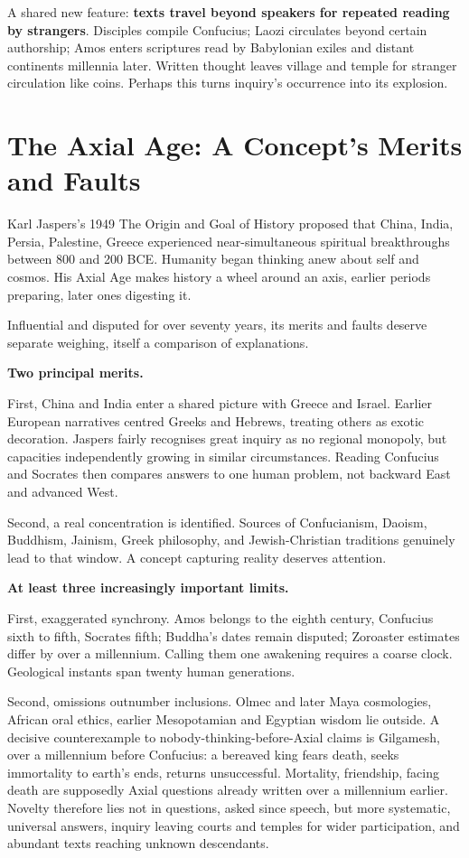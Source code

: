 A shared new feature: \textbf{texts travel beyond speakers for repeated reading by strangers}. Disciples compile Confucius; Laozi circulates beyond certain authorship; Amos enters scriptures read by Babylonian exiles and distant continents millennia later. Written thought leaves village and temple for stranger circulation like coins. Perhaps this turns inquiry's occurrence into its explosion.

\section[The Axial Age: Value and Limits]{The Axial Age: A Concept's Merits and Faults}
Karl Jaspers's 1949 The Origin and Goal of History proposed that China, India, Persia, Palestine, Greece experienced near-simultaneous spiritual breakthroughs between 800 and 200 BCE. Humanity began thinking anew about self and cosmos. His Axial Age makes history a wheel around an axis, earlier periods preparing, later ones digesting it.

Influential and disputed for over seventy years, its merits and faults deserve separate weighing, itself a comparison of explanations.

\textbf{Two principal merits.}

First, China and India enter a shared picture with Greece and Israel. Earlier European narratives centred Greeks and Hebrews, treating others as exotic decoration. Jaspers fairly recognises great inquiry as no regional monopoly, but capacities independently growing in similar circumstances. Reading Confucius and Socrates then compares answers to one human problem, not backward East and advanced West.

Second, a real concentration is identified. Sources of Confucianism, Daoism, Buddhism, Jainism, Greek philosophy, and Jewish-Christian traditions genuinely lead to that window. A concept capturing reality deserves attention.

\textbf{At least three increasingly important limits.}

First, exaggerated synchrony. Amos belongs to the eighth century, Confucius sixth to fifth, Socrates fifth; Buddha's dates remain disputed; Zoroaster estimates differ by over a millennium. Calling them one awakening requires a coarse clock. Geological instants span twenty human generations.

Second, omissions outnumber inclusions. Olmec and later Maya cosmologies, African oral ethics, earlier Mesopotamian and Egyptian wisdom lie outside. A decisive counterexample to nobody-thinking-before-Axial claims is Gilgamesh, over a millennium before Confucius: a bereaved king fears death, seeks immortality to earth's ends, returns unsuccessful. Mortality, friendship, facing death are supposedly Axial questions already written over a millennium earlier. Novelty therefore lies not in questions, asked since speech, but more systematic, universal answers, inquiry leaving courts and temples for wider participation, and abundant texts reaching unknown descendants.

